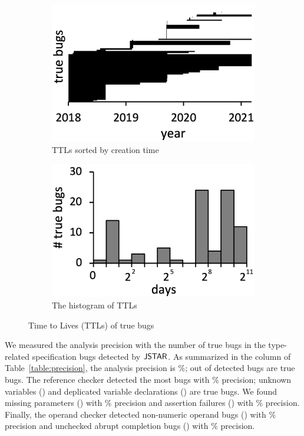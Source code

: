 \begin{figure}
  \centering
  \begin{subfigure}[b]{0.24\textwidth}
    \includegraphics[width=\textwidth]{img/ttl-chro}
    \caption{TTLs sorted by creation time}
  \end{subfigure}
  \begin{subfigure}[b]{0.24\textwidth}
    \includegraphics[width=\textwidth]{img/ttl-count}
    \caption{The histogram of TTLs}
  \end{subfigure}
  \caption{Time to Lives (TTLs) of true bugs}
  \vspace*{-1.5em}
  \label{fig:ttl}
\end{figure}

We measured the analysis precision with the number of true bugs in
the type-related specification bugs detected by $\tool$.
As summarized in the  column of Table~\ref{table:precision}, the analysis precision
is \%;  out of  detected bugs are true bugs.
The reference checker detected the most bugs with \% precision;
 unknown variables () and
 deplicated variable declarations () are true bugs.
We found  missing parameters () with \% precision and
 assertion failures () with \% precision.
Finally, the operand checker detected
 non-numeric operand bugs () with \% precision and
 unchecked abrupt completion bugs () with \% precision.

